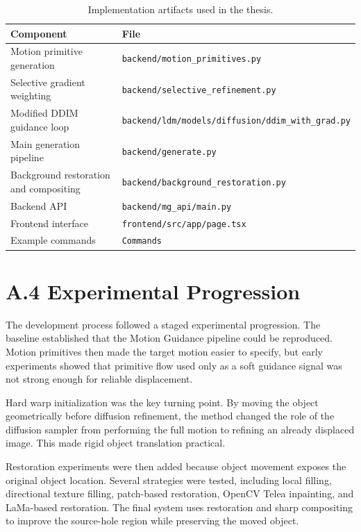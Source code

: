 \begin{table}[p]
  \centering
  \scriptsize
  \caption{Implementation artifacts used in the thesis.}
  \label{tab:appendix-code-artifacts}
  \renewcommand{\arraystretch}{1.2}
  \begin{tabular}{p{2.1in}|p{2.95in}}
    \hline
    \textbf{Component} & \textbf{File} \\ \hline \hline
    Motion primitive generation & \texttt{backend/motion\_primitives.py} \\ \hline
    Selective gradient weighting & \texttt{backend/selective\_refinement.py} \\ \hline
    Modified DDIM guidance loop & \texttt{backend/ldm/models/diffusion/}\newline \texttt{ddim\_with\_grad.py} \\ \hline
    Main generation pipeline & \texttt{backend/generate.py} \\ \hline
    Background restoration and compositing & \texttt{backend/background\_restoration.py} \\ \hline
    Backend API & \texttt{backend/mg\_api/main.py} \\ \hline
    Frontend interface & \texttt{frontend/src/app/page.tsx} \\ \hline
    Example commands & \texttt{Commands} \\ \hline
  \end{tabular}
\end{table}

\section*{A.4 Experimental Progression}

The development process followed a staged experimental progression. The baseline established that the Motion Guidance pipeline could be reproduced. Motion primitives then made the target motion easier to specify, but early experiments showed that primitive flow used only as a soft guidance signal was not strong enough for reliable displacement.

Hard warp initialization was the key turning point. By moving the object geometrically before diffusion refinement, the method changed the role of the diffusion sampler from performing the full motion to refining an already displaced image. This made rigid object translation practical.

Restoration experiments were then added because object movement exposes the original object location. Several strategies were tested, including local filling, directional texture filling, patch-based restoration, OpenCV Telea inpainting, and LaMa-based restoration. The final system uses restoration and sharp compositing to improve the source-hole region while preserving the moved object.


